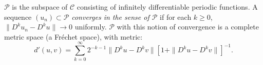 $\mathcal{P}$ is the subspace of $\mathcal{C}$ consisting of infinitely differentiable periodic functions. A sequence $(u_n) \subset \mathcal{P}$ \textit{converges in the sense of $\mathcal{P}$} if for each $k \geq 0$, $\|D^k u_n - D^k u\| \to 0$ uniformly. $\mathcal{P}$ with this notion of convergence is a complete metric space (a Fr\'echet space), with metric:
\[
d'(u, v) = \sum_{k=0}^{\infty} 2^{-k-1} \|D^k u - D^k v\| \left[1 + \|D^k u - D^k v\|\right]^{-1}.
\]
